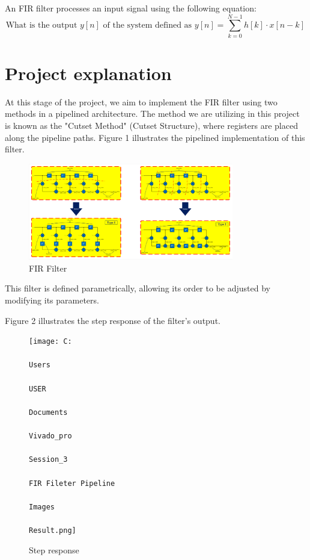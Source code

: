 \documentclass[paper=a4, fontsize=11pt, onecolumn]{scrartcl}	 %
\begin{document}
An FIR filter processes an input signal using the following equation:
\[
\text{What is the output } y[n] \text{ of the system defined as } 
y[n] = \sum_{k=0}^{N-1} h[k] \cdot x[n-k] \,
\]

\section*{Project explanation}



At this stage of the project, we aim to implement the FIR filter using two methods in a pipelined architecture. The method we are utilizing in this project is known as the "Cutset Method" 
(Cutset Structure), where registers are placed along the pipeline paths. Figure 1 illustrates the pipelined implementation of this filter.
\begin{figure}[ht]
    \centering
  \includegraphics[width=0.8\textwidth]{FIR.pdf}
  \caption{FIR Filter}
  \label{fig:sample-image1}
\end{figure}

This filter is defined parametrically, allowing its order to be adjusted by modifying its parameters.

Figure 2 illustrates the step response of the filter's output.

\begin{figure}[ht]
    \centering
  \texttt{[image: C:\\\\Users\\\\USER\\\\Documents\\\\Vivado\_pro\\\\Session\_3\\\\FIR Fileter Pipeline\\\\Images\\\\Result.png]}
  \caption{Step response}
  \label{fig:Result}
\end{figure}
\end{document}
